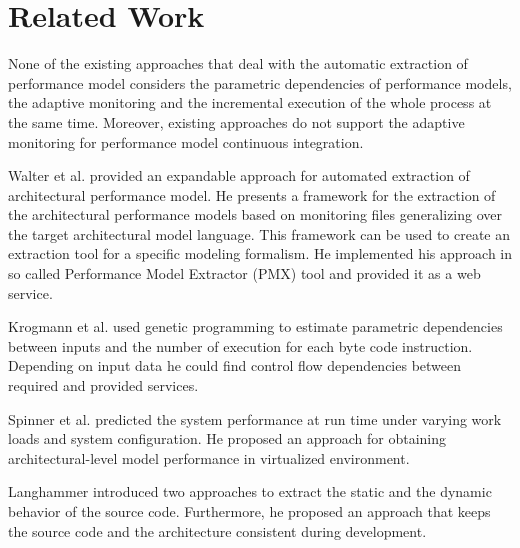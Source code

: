 
\chapter{Related Work}
\label{ch:Related Work}

None of the existing approaches that deal with the automatic extraction of performance
model considers the parametric dependencies of performance models, the adaptive
monitoring and the incremental execution of the whole process at the same time. Moreover,
existing approaches do not support the adaptive monitoring for performance model continuous
integration.

Walter et al. \cite{walter2017expandable} provided an expandable approach for automated extraction of
architectural performance model. He presents a framework for the extraction of
the architectural performance models based on monitoring files generalizing over
the target architectural model language. This framework can be used to create
an extraction tool for a specific modeling formalism. He implemented his approach
in so called Performance Model Extractor (PMX) tool and provided it as a web service.

Krogmann et al. \cite{krogmann2012reconstruction, krogmann2010using} used genetic programming to estimate parametric dependencies between inputs and the number of execution for each byte code instruction.
Depending on input data he could find control flow dependencies between required
and provided services.

Spinner et al. \cite{spinner2016reference} predicted the system performance at run time under varying work
loads and system configuration. He proposed an approach for obtaining architectural-level model performance in virtualized environment.

Langhammer \cite{langhammer2017automated} introduced two approaches to extract the static and the dynamic
behavior of the source code. Furthermore, he proposed an approach that keeps the source code and the 
architecture consistent during development. 
